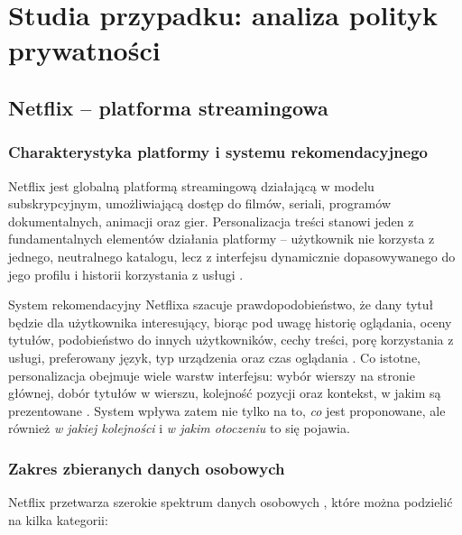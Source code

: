 \documentclass[12pt, a4paper]{article}
\begin{document}
\section{Studia przypadku: analiza polityk prywatności}

\subsection{Netflix -- platforma streamingowa}

\subsubsection{Charakterystyka platformy i systemu rekomendacyjnego}

Netflix jest globalną platformą streamingową działającą w modelu subskrypcyjnym, umożliwiającą dostęp do filmów, seriali, programów dokumentalnych, animacji oraz gier. Personalizacja treści stanowi jeden z fundamentalnych elementów działania platformy -- użytkownik nie korzysta z jednego, neutralnego katalogu, lecz z interfejsu dynamicznie dopasowywanego do jego profilu i historii korzystania z usługi \cite{netflix_recs}.

System rekomendacyjny Netflixa szacuje prawdopodobieństwo, że dany tytuł będzie dla użytkownika interesujący, biorąc pod uwagę historię oglądania, oceny tytułów, podobieństwo do innych użytkowników, cechy treści, porę korzystania z usługi, preferowany język, typ urządzenia oraz czas oglądania \cite{netflix_recs, netflix_research}. Co istotne, personalizacja obejmuje wiele warstw interfejsu: wybór wierszy na stronie głównej, dobór tytułów w wierszu, kolejność pozycji oraz kontekst, w jakim są prezentowane \cite{netflix_recs}. System wpływa zatem nie tylko na to, \textit{co} jest proponowane, ale również \textit{w jakiej kolejności} i \textit{w jakim otoczeniu} to się pojawia.

\subsubsection{Zakres zbieranych danych osobowych}

Netflix przetwarza szerokie spektrum danych osobowych \cite{netflix_privacy, netflix_data}, które można podzielić na kilka kategorii:
\end{document}
